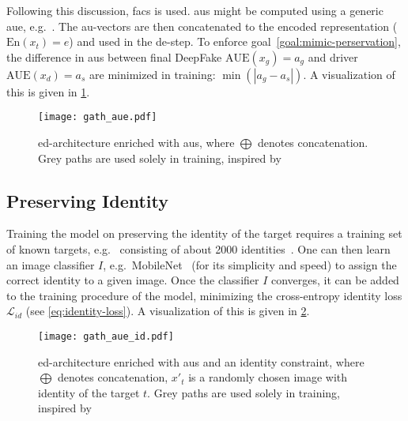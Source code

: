 \par
Following this discussion, \gls{facs} is used. \Glspl{au} might be computed using
a generic \gls{aue}, e.g.\ \cite{Senechal.2015}. The \gls{au}-vectors are then
concatenated to the encoded representation (\(\text{En}(x_t)=e\)) and used in
the \gls{de}-step. To enforce goal~\ref{goal:mimic-perservation}, the difference
in \glspl{au} between final DeepFake \(\text{AUE}(x_g)=a_g\) and driver
\(\text{AUE}(x_d)=a_s\) are minimized in training:
\(\min{(\left|a_g-a_s\right|)}\). A visualization of this is given in \cref{fig:gath-aue}.
\begin{figure}[htp]
    \center{}
    \vspace{-1em}
    \texttt{[image: gath\_aue.pdf]}
    \caption{\gls{ed}-architecture enriched with \glspl{au}, where \(\bigoplus\)
    denotes concatenation. Grey paths are used solely in training, inspired
    by~\cite{Mirsky.2020, Pham.2018}}\label{fig:gath-aue}
    \vspace{-1em}
\end{figure}

\subsection{Preserving Identity}
Training the model on preserving the identity of the target requires a training
set of known targets, e.g.\ \cite{Chen.2015,Cao.2014,Tarres.2011} consisting of 
about 2000 identities~\cite{Pham.2018}. One can then learn an image classifier
\(I\), e.g.\ MobileNet~\cite{Howard.2017} (for its simplicity and speed) to
assign the correct identity to a given image. Once the classifier \(I\)
converges, it can be added to the training procedure of the model, minimizing
the cross-entropy identity loss \(\mathcal{L}_{id}\) (see \cref{eq:identity-loss}).
A visualization of this is given in \cref{fig:gath-aue-id}.
\begin{figure}[htp]
    \vspace{-1em}
    \center{}
    \texttt{[image: gath\_aue\_id.pdf]}
    \caption{\gls{ed}-architecture enriched with \glspl{au} and an identity
    constraint, where \(\bigoplus\) denotes concatenation, \(x'_t\) is a randomly
    chosen image with identity of the target \(t\). Grey paths are used solely
    in training, inspired by~\cite{Mirsky.2020, Pham.2018}}\label{fig:gath-aue-id}
    \vspace{-1em}
\end{figure}

